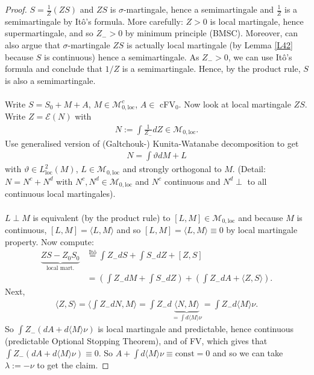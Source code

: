 \documentclass[12pt,a4paper, twoside]{article}
\theoremstyle{definition}
\begin{document}
\begin{proof}
$S= \frac{1}{Z}(ZS)$ and $ZS$ is $\sigma$-martingale, hence a semimartingale and $\frac{1}{Z}$ is a semimartingale by Itô's formula. More carefully: $Z>0$ is local martingale,  hence supermartingale, and so $Z_- >0$ by minimum principle (BMSC). Moreover, can also argue that $\sigma$-martingale $ZS$ is actually local martingale (by Lemma \ref{L42} because $S$ is continuous) hence a semimartingale. As $Z_- >0$, we can use Itô's formula and conclude that $1/Z$ is a semimartingale. Hence, by the product rule, $S$ is also a semimartingale.
\\\\
Write $S= S_0 + M + A$, $M \in \mathcal{M}_{0, \text{loc}}^c$, $A \in $ cFV$_0$. Now look at local martingale $ZS$. Write $Z = \mathcal{E}(N)$ with 
\begin{align*}
N:= \int \frac{1}{Z_-}dZ \in \mathcal{M}_{0, \text{loc}}.
\end{align*}
Use generalised version of (Galtchouk-) Kunita-Watanabe decomposition to get 
\begin{align*}
N= \int \vartheta dM + L
\end{align*}
with $\vartheta \in L_\text{loc}^2(M)$, $L \in \mathcal{M}_{0, \text{loc}}$ and strongly orthogonal to $M$. (Detail: $N=N^c +N^d$ with $N^c, N^d \in \mathcal{M}_{0, \text{loc}}$ and $N^c$ continuous and $N^d \perp$ to all continuous local martingales). 
\\\\
$L \perp M$ is equivalent (by the product rule) to $[L,M] \in \mathcal{M}_{0, \text{loc}}$ and because $M$ is continuous, $[L,M]= \langle L, M \rangle$ and so $[L,M] = \langle L,M \rangle \equiv 0$ by local martingale property. Now compute: 
\begin{align*}
\underbrace{ZS-Z_0S_0}_\text{local mart.} & \overset{\text{Itô}}= \int Z_- dS + \int S_- dZ + [Z,S] \\
&= \left( \int Z_- dM + \int S_- dZ \right) + \left( \int Z_- dA + \langle Z,S \rangle \right).
\end{align*}
Next,  
\begin{align*}
\langle Z,S \rangle = \langle \int Z_- d N, M \rangle = \int Z_- d\underbrace{ \langle N, M \rangle}_{= \int d \langle M \rangle \nu} = \int Z_- d \langle M \rangle \nu.
\end{align*}
So $\int Z_- ( dA + d \langle M \rangle \nu)$ is local martingale and predictable, hence continuous (predictable Optional Stopping Theorem), and of FV,  which gives that $ \int Z_- (dA + d \langle M \rangle \nu) \equiv 0$. So $A + \int d \langle M \rangle \nu \equiv \text{const}=0$ and so we can take $\lambda :=- \nu$ to get the claim. 
\end{proof}
\end{document}
